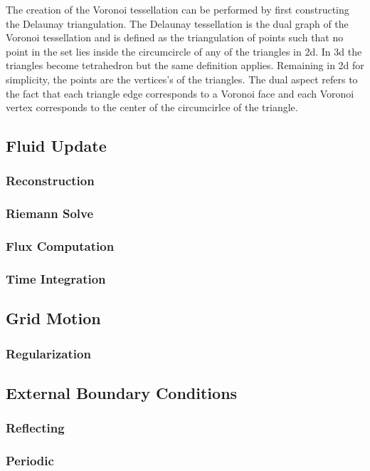 The creation of the Voronoi tessellation can be performed by first constructing
the Delaunay triangulation. The Delaunay tessellation is the dual graph of the
Voronoi tessellation and is defined as the triangulation of points such that
no point in the set lies inside the circumcircle of any of the triangles in
2d. In 3d the triangles become tetrahedron but the same definition applies.
Remaining in 2d for simplicity, the points are the vertices's of the triangles.
The dual aspect refers to the fact that each triangle edge corresponds to a
Voronoi face and each Voronoi vertex corresponds to the center of the
circumcirlce of the triangle. 

\subsection{Fluid Update}
\subsubsection{Reconstruction}
\subsubsection{Riemann Solve}
\label{sec.riemann}

\subsubsection{Flux Computation}
\subsubsection{Time Integration}

\subsection{Grid Motion}
\subsubsection{Regularization}

\subsection{External Boundary Conditions}
\subsubsection{Reflecting}
\subsubsection{Periodic}

